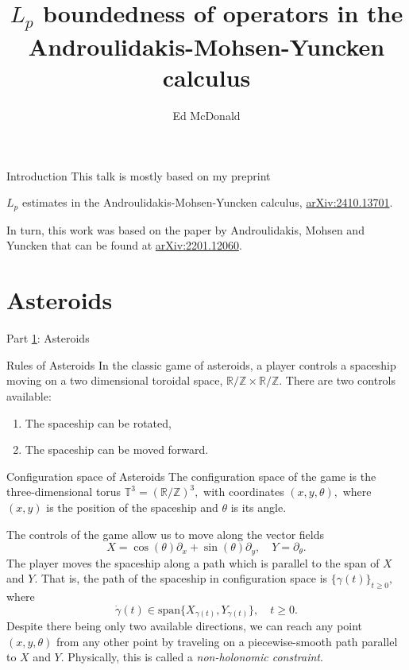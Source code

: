 \documentclass{beamer}
\newcommand\makebeamertitle{\frame{\maketitle}}%
\numberwithin{equation}{section}
\theoremstyle{plain}
\theoremstyle{plain}
\theoremstyle{definition}
\theoremstyle{plain}
\theoremstyle{plain}
\theoremstyle{definition}
\newcommand{\Rl}{\mathbb{R}}
\newcommand{\Itgr}{\mathbb{Z}}
\newcommand{\Circ}{\mathbb{T}}
\begin{document}
\title[$L_p$ estimates in the AMY calculus]{$L_p$ boundedness of operators in the Androulidakis-Mohsen-Yuncken calculus}


\author[E. McDonald]{Ed McDonald}



\makebeamertitle

\begin{frame}{Introduction}
  This talk is mostly based on my preprint
  \begin{center}
    $L_p$ estimates in the Androulidakis-Mohsen-Yuncken calculus, \href{https://arxiv.org/abs/2410.13701}{arXiv:2410.13701}.
  \end{center}
  In turn, this work was based on the paper by Androulidakis, Mohsen and Yuncken that can be found at \href{https://arxiv.org/abs/2201.12060v2}{arXiv:2201.12060}.
\end{frame}

\section{Asteroids}\label{asteroids_section}

\begin{frame}
  \Huge{Part \ref{asteroids_section}: Asteroids}
\end{frame}

\begin{frame}{Rules of Asteroids}
  In the classic game of asteroids, a player controls a spaceship moving on a two dimensional toroidal space, $\Rl/\Itgr\times \Rl/\Itgr.$ There are two controls available:
  \begin{enumerate}
    \item{} The spaceship can be rotated,
    \item{} The spaceship can be moved forward.
  \end{enumerate}
\end{frame}

\begin{frame}{Configuration space of Asteroids}
  The configuration space of the game is the three-dimensional torus $\Circ^3 = (\Rl/\Itgr)^3,$ with coordinates $(x,y,\theta),$ where $(x,y)$ is the position of the spaceship and $\theta$ is its angle.

  The controls of the game allow us to move along the vector fields
  \[
    X = \cos(\theta)\partial_x+\sin(\theta)\partial_y,\quad Y = \partial_\theta.
  \]
  \pause
  The player moves the spaceship along a path which is parallel to the span of $X$ and $Y.$ That is, the path of the spaceship in configuration space is $\{\gamma(t)\}_{t\geq 0},$ where
  \[
    \dot{\gamma}(t) \in \mathrm{span}\{X_{\gamma(t)},Y_{\gamma(t)}\},\quad t\geq 0.
  \]
  \pause
  Despite there being only two available directions, we can reach any point $(x,y,\theta)$ from any other point by traveling on a piecewise-smooth path parallel to $X$ and $Y.$
  \pause
  Physically, this is called a \emph{non-holonomic constraint}.
\end{frame}
\end{document}
